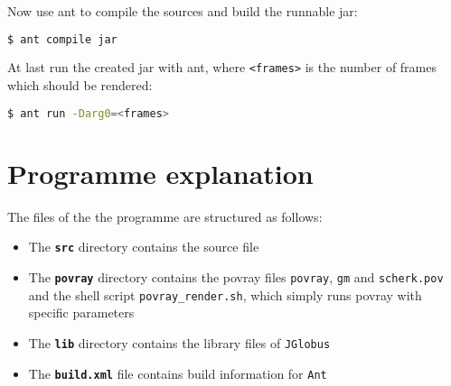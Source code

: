 \documentclass{article}
\begin{document}
Now use ant to compile the sources and build the runnable jar:

\begin{lstlisting}[language=bash]
  $ ant compile jar
\end{lstlisting}

At last run the created jar with ant, where \texttt{<frames>} is the number of frames which should be rendered:

\begin{lstlisting}[language=bash]
  $ ant run -Darg0=<frames>
\end{lstlisting}




\section{Programme explanation}
The files of the the programme are structured as follows:

\begin{itemize}
\item The \texttt{\textbf{src}} directory contains the source file
\item The \texttt{\textbf{povray}} directory contains the povray files \texttt{povray}, \texttt{gm} and \texttt{scherk.pov} and the shell script \texttt{povray\_render.sh}, which simply runs povray with specific parameters
\item The \texttt{\textbf{lib}} directory contains the library files of \texttt{JGlobus}
\item The \texttt{\textbf{build.xml}} file contains build information for \texttt{Ant}
\end{itemize}
\end{document}

